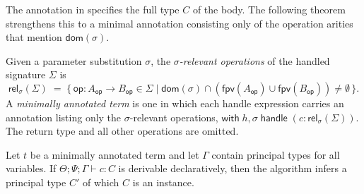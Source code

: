 \documentclass[acmsmall,screen,review,anonymous]{acmart}
\newcommand{\op}{\mathsf{op}}
\newcommand{\with}{\mathsf{with}\;}
\newcommand{\handle}{\;\mathsf{handle}\;}
\newcommand{\dom}{\mathsf{dom}}
\newcommand{\G}{\Gamma}
\newcommand{\Sig}{\Sigma}
\newcommand{\fpv}{\mathsf{fpv}}
\newcommand{\rel}{\mathsf{rel}}
\newcommand{\cjp}[5]{#1; #2; #3 \vdash #4 : #5}
\begin{document}
The annotation in  specifies the full type $C$ of the body.
The following theorem strengthens this to a minimal annotation consisting only of the
operation arities that mention $\dom(\sigma)$.

\begin{definition} \label{def:relevant}
  Given a parameter substitution $\sigma$, the
  \emph{$\sigma$-relevant operations} of the handled signature $\Sig$ is
  \[
    \rel_\sigma(\Sig)
    \;=\;
    \bigl\{\,\op : A_\op \to B_\op \in \Sig \mid
      \dom(\sigma) \cap (\fpv(A_\op) \cup \fpv(B_\op)) \neq \emptyset
    \,\bigr\}.
  \]
  A \emph{minimally annotated term} is one in which each handle expression carries an annotation listing only
  the $\sigma$-relevant operations, $\with h, \sigma \handle (c : \rel_\sigma(\Sig))$.
  The return type and all other operations are omitted.
\end{definition}

\begin{corollary}\label{thm:minimal-complete}
  Let $t$ be a minimally annotated term and let $\G$ contain principal types for all
  variables.
  If $\cjp{\Theta}{\Psi}{\G}{c}{C}$ is derivable declaratively, then the algorithm
  infers a principal type $C'$ of which $C$ is an instance.
\end{corollary}
\end{document}
